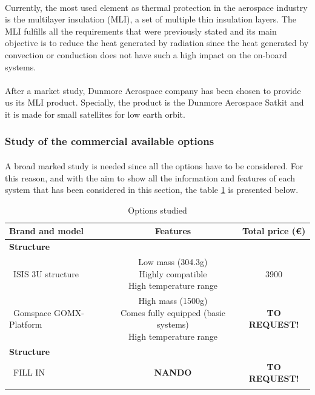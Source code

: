 \paragraph{} Currently, the most used element as thermal protection in the aerospace industry is the multilayer insulation (MLI), a set of multiple thin insulation layers. The MLI fulfills all the requirements that were previously stated and its main objective is to reduce the heat generated by radiation since the heat generated by convection or conduction does not have such a high impact on the on-board systems.

\paragraph{} 
After a market study, Dunmore Aerospace company has been chosen to provide us its MLI product. Specially, the product is the Dunmore Aerospace Satkit and it is made for small satellites for low earth orbit.

\subsubsection{Study of the commercial available options}
\paragraph{}A broad marked study is needed since all the options have to be considered. For this reason, and with the aim to show all the information and features of each system that has been considered in this section, the table \ref{structureoptions} is presented below.


\begin{longtable}{| l | c | c | }
\hline
\rowcolor[gray]{0.80}	\textbf{Brand and model} &  \textbf{Features}     & \textbf{Total price (\euro)}   \\
\hline
\endfirsthead

\rowcolor[gray]{0.85} \textbf{Structure} &  &  \\
	   ~ISIS 3U structure & \makecell{Low mass (304.3g) \\ Highly compatible \\ High temperature range} & 3900 \\
	   \hline
	   ~Gomspace GOMX-Platform & \makecell{High mass (1500g) \\ Comes fully equipped (basic systems) \\ High temperature range} & \textbf{TO REQUEST!} \\
	   \hline
\rowcolor[gray]{0.85} \textbf{Structure} &  &  \\
	   ~FILL IN & \textbf{NANDO} & \textbf{TO REQUEST!} \\
	\hline

\caption{Options studied}
\label{structureoptions}
\end{longtable}

